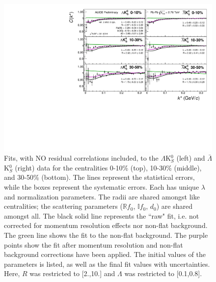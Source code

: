 \documentclass[../AnalysisNoteJBuxton.tex]{subfiles}
\begin{document}
\begin{figure}[h]
  \centering
  \includegraphics[width=\textwidth]{7_ResultsAndDiscussion/Figures/canKStarCfwFitsLamK0wConj_0010_1030_3050_MomResCrctn_NonFlatBgdCrctn_SingleLamParam_NoRes.pdf}
  \caption[$\Lambda$K$^{0}_{S}$($\bar{\Lambda}$K$^{0}_{S}$) Fits with No Residuals]{Fits, with NO residual correlations included, to the $\Lambda$K$^{0}_{S}$ (left) and $\bar{\Lambda}$K$^{0}_{S}$ (right) data for the centralities 0-10\% (top), 10-30\% (middle), and 30-50\% (bottom).
The lines represent the statistical errors, while the boxes represent the systematic errors.
Each has unique $\lambda$ and normalization parameters.
The radii are shared amongst like centralities; the scattering parameters ($\mathbb{R}f_{0}$, $\mathbb{I}f_{0}$, $d_{0}$) are shared amongst all.
The black solid line represents the ``raw" fit, i.e. not corrected for momentum resolution effects nor non-flat background.  
The green line shows the fit to the non-flat background.
The purple points show the fit after momentum resolution and non-flat background corrections have been applied.
The initial values of the parameters is listed, as well as the final fit values with uncertainties.
Here, $R$ was restricted to [2.,10.] and $\Lambda$ was restricted to [0.1,0.8].}
  \label{fig:LamK0wConjFits_NoRes}
\end{figure}
\end{document}
